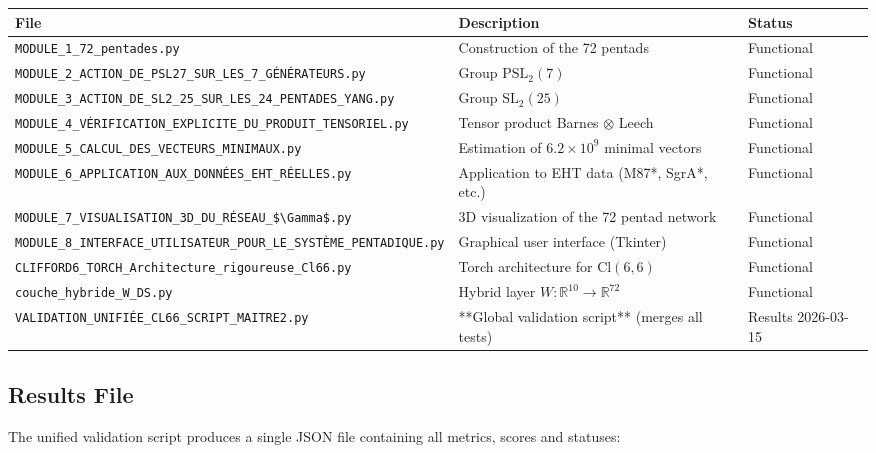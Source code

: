 \documentclass[11pt]{article}
\providecommand{\cmark}{\ding{51}}
\newcommand{\symSucces}{\textcolor{success}{\cmark}}
\begin{document}
\begin{center}
\begin{adjustbox}{max width=\textwidth}
\begin{tabular}{@{}lll@{}}
\toprule
\textbf{File} & \textbf{Description} & \textbf{Status} \\
\midrule
\verb`MODULE_1_72_pentades.py` & Construction of the 72 pentads & \symSucces Functional \\
\verb`MODULE_2_ACTION_DE_PSL27_SUR_LES_7_GÉNÉRATEURS.py` & Group $\text{PSL}_2(7)$ & \symSucces Functional \\
\verb`MODULE_3_ACTION_DE_SL2_25_SUR_LES_24_PENTADES_YANG.py` & Group $\text{SL}_2(25)$ & \symSucces Functional \\
\verb`MODULE_4_VÉRIFICATION_EXPLICITE_DU_PRODUIT_TENSORIEL.py` & Tensor product Barnes $\otimes$ Leech & \symSucces Functional \\
\verb`MODULE_5_CALCUL_DES_VECTEURS_MINIMAUX.py` & Estimation of $6.2\times10^9$ minimal vectors & \symSucces Functional \\
\verb`MODULE_6_APPLICATION_AUX_DONNÉES_EHT_RÉELLES.py` & Application to EHT data (M87*, SgrA*, etc.) & \symSucces Functional \\
\verb`MODULE_7_VISUALISATION_3D_DU_RÉSEAU_$\Gamma$.py` & 3D visualization of the 72 pentad network & \symSucces Functional \\
\verb`MODULE_8_INTERFACE_UTILISATEUR_POUR_LE_SYSTÈME_PENTADIQUE.py` & Graphical user interface (Tkinter) & \symSucces Functional \\
\verb`CLIFFORD6_TORCH_Architecture_rigoureuse_Cl66.py` & Torch architecture for $\text{Cl}(6,6)$ & \symSucces Functional \\
\verb`couche_hybride_W_DS.py` & Hybrid layer $W : \mathbb{R}^{10} \to \mathbb{R}^{72}$ & \symSucces Functional \\
\verb`VALIDATION_UNIFIÉE_CL66_SCRIPT_MAITRE2.py` & **Global validation script** (merges all tests) & \symSucces Results 2026-03-15 \\
\bottomrule
\end{tabular}
\end{adjustbox}
\end{center}

\hypertarget{results-file}{%
\subsection{Results File}\label{results-file}}

The unified validation script produces a single JSON file containing all
metrics, scores and statuses:
\end{document}
